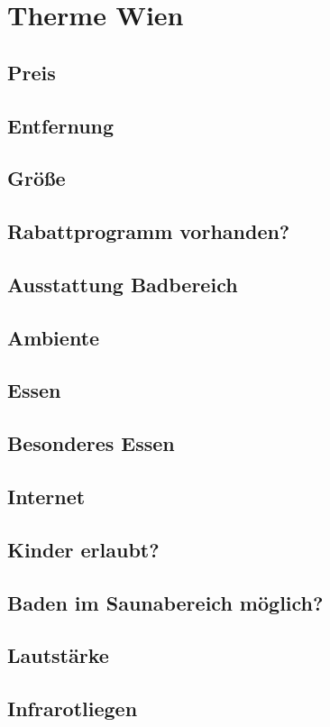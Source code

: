 \documentclass{article}
\begin{document}
\section*{Therme Wien}
\subsection*{Preis}
\subsection*{Entfernung}
\subsection*{Größe}
\subsection*{Rabattprogramm vorhanden?}
\subsection*{Ausstattung Badbereich}
\subsection*{Ambiente}
\subsection*{Essen}
\subsection*{Besonderes Essen}
\subsection*{Internet}
\subsection*{Kinder erlaubt?}
\subsection*{Baden im Saunabereich möglich?}
\subsection*{Lautstärke}
\subsection*{Infrarotliegen}
\end{document}

